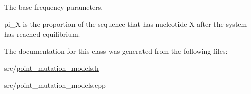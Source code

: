 The base frequency parameters. 

pi\+\_\+X is the proportion of the sequence that has nucleotide X after the system has reached equilibrium. 

The documentation for this class was generated from the following files\+:\begin{DoxyCompactItemize}
\item 
src/\hyperlink{point__mutation__models_8h}{point\+\_\+mutation\+\_\+models.\+h}\item 
src/point\+\_\+mutation\+\_\+models.\+cpp\end{DoxyCompactItemize}
